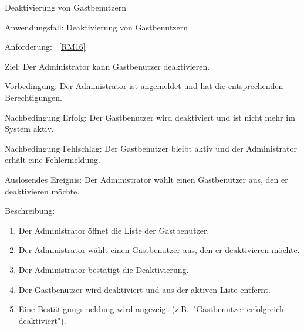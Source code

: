 \begin{function}{50}{Deaktivierung von Gastbenutzern}
    \item[Anwendungsfall:] Deaktivierung von Gastbenutzern
    \item[Anforderung:] ~\ref{RM16}
    \item[Ziel:] Der Administrator kann Gastbenutzer deaktivieren.
    \item[Vorbedingung:] Der Administrator ist angemeldet und hat die entsprechenden Berechtigungen.
    \item[Nachbedingung Erfolg:] Der Gastbenutzer wird deaktiviert und ist nicht mehr im System aktiv.
    \item[Nachbedingung Fehlschlag:] Der Gastbenutzer bleibt aktiv und der Administrator erhält eine Fehlermeldung.
    \item[Auslösendes Ereignis:] Der Administrator wählt einen Gastbenutzer aus, den er deaktivieren möchte.
    \item[Beschreibung:] ~
    \begin{enumerate}
        \item Der Administrator öffnet die Liste der Gastbenutzer.
        \item Der Administrator wählt einen Gastbenutzer aus, den er deaktivieren möchte.
        \item Der Administrator bestätigt die Deaktivierung.
        \item Der Gastbenutzer wird deaktiviert und aus der aktiven Liste entfernt.
        \item Eine Bestätigungsmeldung wird angezeigt (z.B.\ "Gastbenutzer erfolgreich deaktiviert").
    \end{enumerate}
\end{function}

\pagebreak

